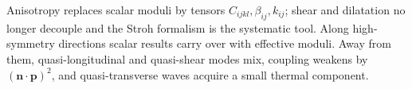 \begin{summarybox}[Summary]
Anisotropy replaces scalar moduli by tensors $C_{ijkl},\beta_{ij},k_{ij}$; shear and dilatation no longer decouple and the Stroh formalism is the systematic tool. Along high-symmetry directions scalar results carry over with effective moduli. Away from them, quasi-longitudinal and quasi-shear modes mix, coupling weakens by $(\bm n\cdot\bm p)^2$, and quasi-transverse waves acquire a small thermal component.
\end{summarybox}